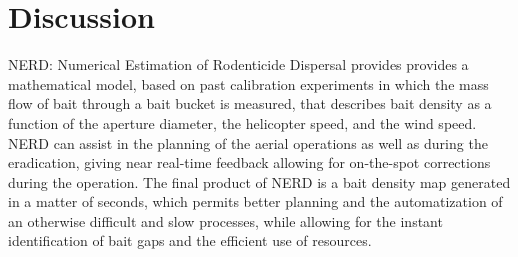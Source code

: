 \section{Discussion}
NERD: Numerical Estimation of Rodenticide Dispersal provides provides a mathematical model, based on past calibration experiments in which the mass flow of bait through a bait bucket is measured, that describes bait density as a function of the aperture diameter, the helicopter speed, and the wind speed. NERD can assist in the planning of the aerial operations as well as during the eradication, giving near real-time feedback allowing for on-the-spot corrections during the operation. The final product of NERD is a bait density map generated in a matter of seconds, which permits better planning and the automatization of an otherwise difficult and slow processes, while allowing for the instant identification of bait gaps and the efficient use of resources.
